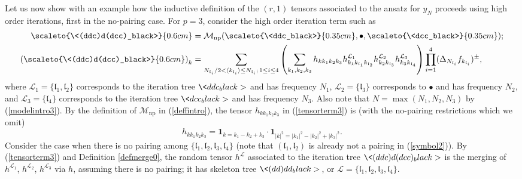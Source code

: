 \documentclass[11 pt,reqno]{amsart}
\theoremstyle{definition}
\theoremstyle{remark}
\numberwithin{equation}{section}
\newcommand{\Lc}{\mathcal{L}}
\renewcommand{\Mc}{\mathcal{M}}
\newcommand{\lf}{\mathfrak{l}}
\begin{document}
{Let us now show with an example how the inductive definition of the $(r,1)$ tensors associated to the ansatz for $y_N$ proceeds using high order iterations, first in the no-pairing case. For $p=3$, consider the high order iteration term such as
\begin{equation}\label{tensorterm3}
\begin{aligned}
\scaleto{\<(ddc)d(dcc)_black>}{0.6cm}&= \Mc_{\mathrm{np}}(\scaleto{\<ddc_black>}{0.35cm}, \bullet, \scaleto{\<dcc_black>}{0.35cm});\\
\left(\scaleto{\<(ddc)d(dcc)_black>}{0.6cm}\right)_{k}&=\sum_{N_{\lf_i}/2<\langle k_{\lf_i}\rangle\leq N_{\lf_i};\,1\leq i\leq 4} \left(\sum_{k_1,k_2,k_3} h_{kk_1k_2k_3} h^{\Lc_1}_{k_1k_{\lf_1}k_{\lf_2}} h^{\Lc_2}_{k_2k_{\lf_3}} h^{\Lc_3}_{k_3k_{\lf_4}}\right) \prod_{i=1}^4 (\Delta_{N_{\lf_i}}f_{k_{\lf_i}})^{\pm},
\end{aligned}
\end{equation}
where $\Lc_1 = \{\lf_1, \lf_2\}$ corresponds to the iteration tree $\<ddc_black>$ and has frequency $N_1$, $\Lc_2 = \{\lf_3\}$ corresponds to $\bullet$ and has frequency $N_2$, and $\Lc_3 = \{\lf_4\}$ corresponds to the iteration tree $\<dcc_black>$ and has frequency $N_3$. Also note that $N= \max (N_1, N_2, N_3)$ by (\ref{modelintro3}). By the definition of $\Mc_{\mathrm{np}}$ in (\ref{deffintro}), the tensor $h_{kk_1k_2k_3}$ in (\ref{tensorterm3}) is (with the no-pairing restrictions which we omit)
\begin{equation}\label{formhintro}
h_{kk_1k_2k_3} = \mathbf{1}_{k=k_1-k_2+k_3}\cdot \mathbf{1}_{|k|^2=|k_1|^2-|k_2|^2+|k_3|^2}.
\end{equation}
Consider the case  when there is no pairing among $\{\lf_1,\lf_2,\lf_3,\lf_4\}$ (note that $(\lf_1, \lf_2)$ is already not a pairing in (\ref{symbol2})). 
By (\ref{tensorterm3}) and Definition \ref{defmerge0}, the random tensor $h^\Lc$ associated to  the iteration tree $\<(ddc)d(dcc)_black>$ is the merging of $h^{\Lc_1}$, $h^{\Lc_2}$, $h^{\Lc_3}$ via $h$, assuming there is no pairing; it has skeleton tree $\<(dd)dd_black>\,$, or $\Lc = \{\lf_1,\lf_2,\lf_3,\lf_4\}$.

}
\end{document}
